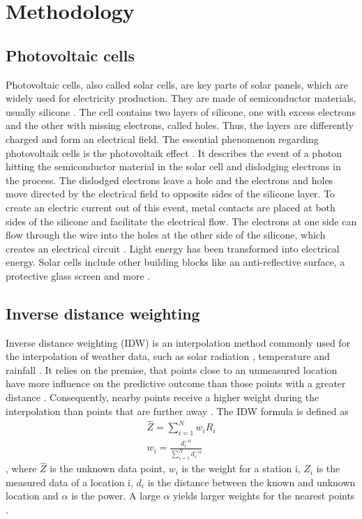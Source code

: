 \documentclass{article}
\begin{document}
\section{Methodology}
\subsection{Photovoltaic cells}\label{sec:pv}

Photovoltaic cells, also called solar cells, are key parts of solar panels, which are widely used for electricity production.
They are made of semiconductor materials, usually silicone \cite{Goetzberger2002}. The cell contains two layers of silicone, one with excess electrons and the other with missing electrons, called holes. Thus, the layers are differently charged and form an electrical field. 
The essential phenomenon regarding photovoltaik cells is the photovoltaik effect \cite{Goetzberger2002}. It describes the event of a photon hitting the semiconductor material in the solar cell and dislodging electrons in the process. The dislodged electrons leave a hole and the electrons and holes move directed by the electrical field to opposite sides of the silicone layer\cite{SolarCells}. To create an electric current out of this event, metal contacts are placed at both sides of the silicone and facilitate the electrical flow. The electrons at one side can flow through the wire into the holes at the other side of the silicone, which creates an electrical circuit \cite{SolarCells}. Light energy has been transformed into electrical energy. Solar cells include other building blocks like an anti-reflective surface, a protective glass screen and more \cite{SolarCells}.

\subsection{Inverse distance weighting}
Inverse distance weighting (IDW) is an interpolation method commonly used for the interpolation of weather data, such as solar radiation \cite{Loghmari2018}, temperature \cite{Cao2009} and rainfall \cite{Chen2012}. 
It relies on the premise, that points close to an unmeasured location have more influence on the predictive outcome than those points with a greater distance \cite{Chen2012}. 
Consequently, nearby points receive a higher weight during the interpolation than points that are further away \cite{Lu2008}. 
The IDW formula is defined as
\begin{align}
    \hat{Z} = \sum_{i=1}^N w_iR_i \\
    w_i = \frac{d_i^{-\alpha}}{\sum_{i=1}^N{d_i^{-\alpha}}}
\end{align} \cite{Chen2012},
 where $\hat{Z}$ is the unknown data point, $w_i$ is the weight for a station i, $Z_i$ is the measured data of a location i, $d_i$ is the distance between the known and unknown location and $\alpha$ is the power. 
 A large $\alpha$ yields larger weights for the nearest points \cite{Lu2008}.
\end{document}
